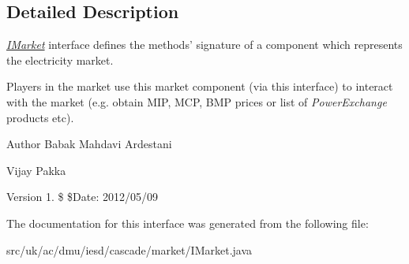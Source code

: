 \subsection{Detailed Description}
{\itshape \hyperlink{interfaceuk_1_1ac_1_1dmu_1_1iesd_1_1cascade_1_1market_1_1_i_market}{I\-Market}} interface defines the methods' signature of a component which represents the electricity market. 

Players in the market use this market component (via this interface) to interact with the market (e.\-g. obtain M\-I\-P, M\-C\-P, B\-M\-P prices or list of {\itshape Power\-Exchange} products etc).

\begin{DoxyAuthor}{Author}
Babak Mahdavi Ardestani 

Vijay Pakka 
\end{DoxyAuthor}
\begin{DoxyVersion}{Version}
1. \$ \$\-Date\-: 2012/05/09 
\end{DoxyVersion}


The documentation for this interface was generated from the following file\-:\begin{DoxyCompactItemize}
\item 
src/uk/ac/dmu/iesd/cascade/market/I\-Market.\-java\end{DoxyCompactItemize}

